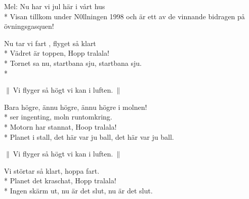 \begin{SongText}[Molnen]
    \begin{SongInfo}
        Mel: Nu har vi jul här i vårt hus\\*%
        Visan tillkom under N0llningen 1998 och är ett av de vinnande bidragen på övningsgasquen!
    \end{SongInfo}
    \begin{SongVerse}
        Nu tar vi fart , flyget så klart\\*%
        Vädret är toppen, Hopp tralala!\\*%
        Tornet sa nu, startbana sju, startbana sju.\\*%
    \end{SongVerse}
    \begin{SongVerse}
        $\|\:$Vi flyger så högt vi kan i luften.$\:\|$
    \end{SongVerse}
    \begin{SongVerse}
        Bara högre, ännu högre, ännu högre i molnen!\\*%
        ser ingenting, moln runtomkring.\\*%
        Motorn har stannat, Hoop tralala!\\*%
        Planet i stall, det  här var ju ball, det här var ju ball.
    \end{SongVerse}
    \begin{SongVerse}
        $\|\:$Vi flyger så högt vi kan i luften.$\:\|$
    \end{SongVerse}
    \begin{SongVerse}
        Vi störtar så klart, hoppa  fart.\\*%
        Planet det kraschat, Hopp tralala!\\*%
        Ingen skärm ut, nu är det slut, nu är det slut.
    \end{SongVerse}
\end{SongText}
